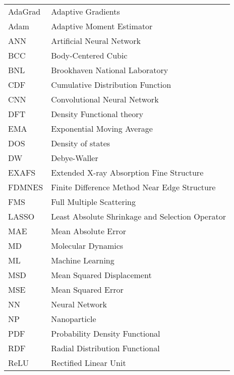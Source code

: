 \begin{table}[h]
    \begin{tabular}{ll} 
    AdaGrad & Adaptive Gradients                            \\
    Adam   & Adaptive Moment Estimator                      \\
    ANN   & Artificial Neural Network                       \\
    BCC   &   Body-Centered Cubic                           \\
    BNL   & Brookhaven National Laboratory                  \\
    CDF   & Cumulative Distribution Function                \\
    CNN   & Convolutional Neural Network                    \\
    DFT   & Density Functional theory                       \\
    EMA   & Exponential Moving Average                      \\
    DOS   & Density of states                               \\
    DW    & Debye-Waller                                    \\
    EXAFS & Extended X-ray Absorption Fine Structure        \\
    FDMNES & Finite Difference Method Near Edge Structure   \\
    FMS   & Full Multiple Scattering                        \\
    LASSO & Least Absolute Shrinkage and Selection Operator \\
    MAE   & Mean Absolute Error                             \\
    MD   & Molecular Dynamics                               \\
    ML    & Machine Learning                                \\
    MSD   & Mean Squared Displacement                       \\
    MSE   & Mean Squared Error                              \\
    NN    & Neural Network                                  \\
    NP    & Nanoparticle                                    \\
    PDF   & Probability Density Functional                  \\
    RDF   & Radial Distribution Functional                  \\
    ReLU  & Rectified Linear Unit                           \\

\end{tabular}
\end{table}
